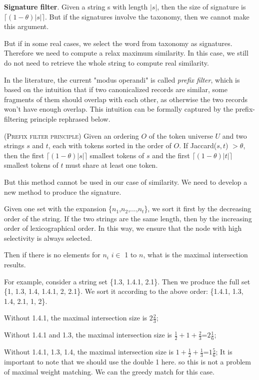 \textbf{Signature filter}. Given a string s with length $|s|$, then the size of signature is $\lceil (1-\theta)|s| \rceil$. But if the signatures involve the taxonomy, then we cannot make this argument.

But if in some real cases, we select the word from taxonomy as signatures. Therefore we need to compute a relax maximum similarity. In this case, we still do not need to retrieve the whole string to compute real similarity.


In the literature, the current "modus operandi" is called \textit{prefix filter}, which is based on the intuition that if two canonicalized records are similar, some fragments of them should overlap with each other, as otherwise the two records
won't have enough overlap. This intuition can be formally captured by the prefix-filtering
principle \cite{conf/icde/ChaudhuriGK06} rephrased below.

\begin{lem} (\textsc{Prefix filter principle}) \cite{conf/icde/ChaudhuriGK06} Given an
ordering $O$ of the token universe $U$ and two strings $s$ and $t$, each with tokens sorted in the
order of $O$.   If Jaccard($s, t$) $> \theta$, then the first $\lceil(1-\theta)|s|\rceil$ smallest
tokens of $s$ and the first $\lceil(1-\theta)|t|\rceil$ smallest
tokens of $t$  must share at least one token.
\end{lem}

But this method cannot be used in our case of similarity. We need to develop a new method to produce the signature.

Given one set with the expansion \{$n_1$,$n_2$,...,$n_t$\}, we sort it first by the decreasing order of the string. If the two strings are the same length, then by the increasing order of lexicographical order. In this way, we ensure that the node with high selectivity is always selected.

Then if there is no elements for $n_i$ $ i \in $ 1 to $n$, what is the maximal intersection results.

For example, consider a string set \{1.3, 1.4.1, 2.1\}. Then we produce the full set \{1, 1.3, 1.4, 1.4.1, 2, 2.1\}. We sort it according to the above order: \{1.4.1, 1.3, 1.4, 2.1, 1, 2\}.

Without 1.4.1, the maximal intersection size is $2\frac{2}{3}$;

Without 1.4.1 and 1.3, the maximal intersection size is $\frac{1}{2}+1+\frac{2}{3}$=$2\frac{1}{6}$;

Without 1.4.1, 1.3, 1.4, the maximal intersection size is $1+\frac{1}{2}+\frac{1}{3}$=$1\frac{5}{6}$; It is important to note that we should use the double 1 here. so this is not a problem of maximal weight matching. We can the greedy match for this case.

